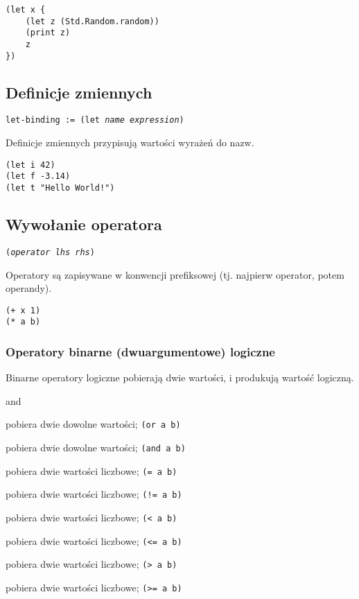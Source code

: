 \begin{lstlisting}
(let x {
    (let z (Std.Random.random))
    (print z)
    z
})
\end{lstlisting}

\subsection{Definicje zmiennych}
\label{viuact_spec_let_binding}

\texttt{let-binding := (let \emph{name} \emph{expression})}
\vspace{1em}

Definicje zmiennych przypisują wartości wyrażeń do nazw.

\begin{lstlisting}
(let i 42)
(let f -3.14)
(let t "Hello World!")
\end{lstlisting}

\subsection{Wywołanie operatora}

\texttt{(\emph{operator} \emph{lhs} \emph{rhs})}
\vspace{1em}

Operatory są zapisywane w konwencji prefiksowej (tj. najpierw operator, potem operandy).

\begin{lstlisting}
(+ x 1)
(* a b)
\end{lstlisting}

\subsubsection{Operatory binarne (dwuargumentowe) logiczne}

Binarne operatory logiczne pobierają dwie wartości, i produkują wartość logiczną.

\begin{labeling}{and}
    \item[\texttt{or}] pobiera dwie dowolne wartości; \texttt{(or a b)}
    \item[\texttt{and}] pobiera dwie dowolne wartości; \texttt{(and a b)}
    \item[\texttt{=}] pobiera dwie wartości liczbowe; \texttt{(= a b)}
    \item[\texttt{!=}] pobiera dwie wartości liczbowe; \texttt{(!= a b)}
    \item[\texttt{<}] pobiera dwie wartości liczbowe; \texttt{(< a b)}
    \item[\texttt{<=}] pobiera dwie wartości liczbowe; \texttt{(<= a b)}
    \item[\texttt{>}] pobiera dwie wartości liczbowe; \texttt{(> a b)}
    \item[\texttt{>=}] pobiera dwie wartości liczbowe; \texttt{(>= a b)}
\end{labeling}


